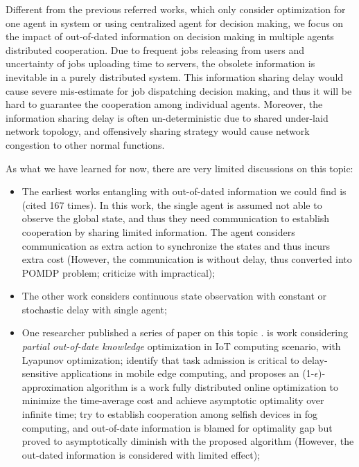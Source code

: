 Different from the previous referred works, which only consider optimization for one agent in system or using centralized agent for decision making, we focus on the impact of out-of-dated information on decision making in multiple agents distributed cooperation.
Due to frequent jobs releasing from users and uncertainty of jobs uploading time to servers, the obsolete information is inevitable in a purely distributed system.
This information sharing delay would cause severe mis-estimate for job dispatching decision making, and thus it will be hard to guarantee the cooperation among individual agents.
Moreover, the information sharing delay is often un-deterministic due to shared under-laid network topology, and offensively sharing strategy would cause network congestion to other normal functions.


As what we have learned for now, there are very limited discussions on this topic:
\begin{itemize}
    \item The earliest works entangling with out-of-dated information we could find is \cite{ref-01} (cited 167 times). In this work, the single agent is assumed not able to observe the global state, and thus they need communication to establish cooperation by sharing limited information. The agent considers communication as extra action to synchronize the states and thus incurs extra cost (However, the communication is without delay, thus converted into POMDP problem; criticize with impractical);
    \item The other work \cite{ref-02} considers continuous state observation with constant or stochastic delay with single agent;
    \item One researcher published a series of paper on this topic \cite{Lyu2017,Lyu2018,Lyu2018a,Lyu2018b}.
        \cite{Lyu2017} is work considering \emph{partial out-of-date knowledge} optimization in IoT computing scenario, with Lyapunov optimization;
         \cite{Lyu2018} identify that task admission is critical to delay-sensitive applications in mobile edge computing, and proposes an (1-$\epsilon$)-approximation algorithm
         \cite{Lyu2018a} is a work fully distributed online optimization to minimize the time-average cost and achieve asymptotic optimality over infinite time;
        \cite{Lyu2018b} try to establish cooperation among selfish devices in fog computing, and out-of-date information is blamed for optimality gap but proved to asymptotically diminish with the proposed algorithm (However, the out-dated information is considered with limited effect);
\end{itemize}

